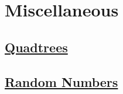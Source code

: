 \section{Miscellaneous}


\subsection*{\href{https://github.com/d3/d3-quadtree}{Quadtrees}}




\subsection*{\href{https://github.com/d3/d3-random}{Random Numbers}}


